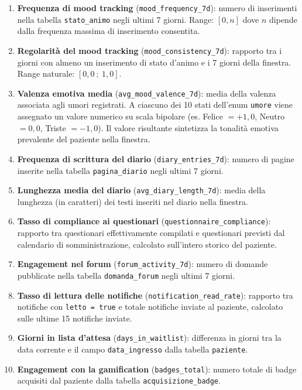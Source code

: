 \begin{enumerate}
    \item \textbf{Frequenza di mood tracking} (\texttt{mood\_frequency\_7d}): numero di inserimenti nella tabella \texttt{stato\_animo} negli ultimi 7 giorni. Range: $[0, n]$ dove $n$ dipende dalla frequenza massima di inserimento consentita.
    
    \item \textbf{Regolarità del mood tracking} (\texttt{mood\_consistency\_7d}): rapporto tra i giorni con almeno un inserimento di stato d'animo e i 7 giorni della finestra. Range naturale: $[0{,}0\ ;\ 1{,}0]$.
    
    \item \textbf{Valenza emotiva media} (\texttt{avg\_mood\_valence\_7d}): media della valenza associata agli umori registrati. A ciascuno dei 10 stati dell'enum \texttt{umore} viene assegnato un valore numerico su scala bipolare (es. Felice $= +1{,}0$, Neutro $= 0{,}0$, Triste $= -1{,}0$). Il valore risultante sintetizza la tonalità emotiva prevalente del paziente nella finestra.
    
    \item \textbf{Frequenza di scrittura del diario} (\texttt{diary\_entries\_7d}): numero di pagine inserite nella tabella \texttt{pagina\_diario} negli ultimi 7 giorni.
    
    \item \textbf{Lunghezza media del diario} (\texttt{avg\_diary\_length\_7d}): media della lunghezza (in caratteri) dei testi inseriti nel diario nella finestra.
    
    \item \textbf{Tasso di compliance ai questionari} (\texttt{questionnaire\_compliance}): rapporto tra questionari effettivamente compilati e questionari previsti dal calendario di somministrazione, calcolato sull'intero storico del paziente.
    
    \item \textbf{Engagement nel forum} (\texttt{forum\_activity\_7d}): numero di domande pubblicate nella tabella \texttt{domanda\_forum} negli ultimi 7 giorni.
    
    \item \textbf{Tasso di lettura delle notifiche} (\texttt{notification\_read\_rate}): rapporto tra notifiche con \texttt{letto = true} e totale notifiche inviate al paziente, calcolato sulle ultime 15 notifiche inviate.
    
    \item \textbf{Giorni in lista d'attesa} (\texttt{days\_in\_waitlist}): differenza in giorni tra la data corrente e il campo \texttt{data\_ingresso} dalla tabella \texttt{paziente}.
    
    \item \textbf{Engagement con la gamification} (\texttt{badges\_total}): numero totale di badge acquisiti dal paziente dalla tabella \texttt{acquisizione\_badge}.
\end{enumerate}

